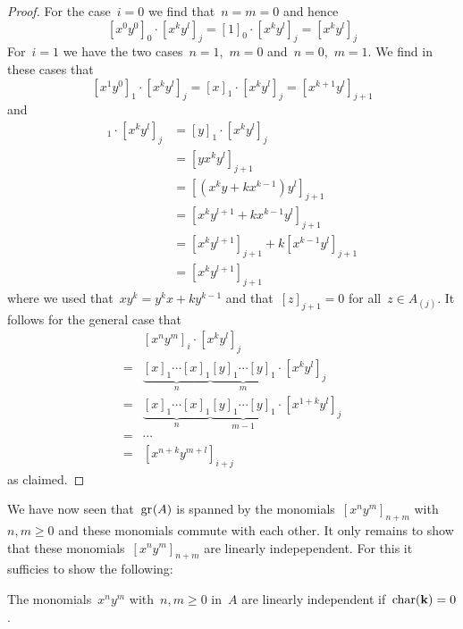 \begin{example}
  \begin{proof}
    For the case~$i = 0$ we find that~$n = m = 0$ and hence
    \[
      [x^0 y^0]_0 \cdot [x^k y^l]_j
      =
      [1]_0 \cdot [x^k y^l]_j
      =
      [x^k y^l]_j
    \]
    For~$i = 1$ we have the two cases~$n = 1$,~$m = 0$ and~$n = 0$,~$m = 1$.
    We find in these cases that
    \[
      [x^1 y^0]_1 \cdot [x^k y^l]_j
      =
      [x]_1 \cdot [x^k y^l]_j
      =
      [x^{k+1} y^l]_{j+1}
    \]
    and
    \begin{align*}
      [x^0 y^1]_1 \cdot [x^k y^l]_j
      &=
      [y]_1 \cdot [x^k y^l]_j
      \\
      &=
      [y x^k y^l]_{j+1}
      \\
      &=
      [(x^k y + k x^{k-1}) y^l]_{j+1}
      \\
      &=
      [x^k y^{l+1} + k x^{k-1} y^l]_{j+1}
      \\
      &=
      [x^k y^{l+1}]_{j+1} + k [x^{k-1} y^l]_{j+1}
      \\
      &=
      [x^k y^{l+1}]_{j+1}
    \end{align*}
    where we used that~$x y^k = y^k x + k y^{k-1}$ and that~$[z]_{j+1} = 0$ for all~$z \in A_{(j)}$.
    It follows for the general case that
    \begin{align*}
      {}&
      [x^n y^m]_i \cdot [x^k y^l]_j
      \\
      ={}&
      \underbrace{ [x]_1 \dotsm [x]_1 }_{n}
      \underbrace{ [y]_1 \dotsm [y]_1 }_{m}
      \cdot
      [x^k y^l]_j
      \\
      ={}&
      \underbrace{ [x]_1 \dotsm [x]_1 }_{n}
      \underbrace{ [y]_1 \dotsm [y]_1 }_{m-1}
      \cdot
      [x^{1+k}  y^l]_j
      \\
      ={}&
      \dotsb
      \\
      ={}&
      [x^{n+k} y^{m+l}]_{i+j}
    \end{align*}
    as claimed.
  \end{proof}

  We have now seen that~$\gr(A)$ is spanned by the monomials~$[x^n y^m]_{n+m}$ with~$n, m \geq 0$ and these monomials commute with each other.
  It only remains to show that these monomials~$[x^n y^m]_{n+m}$ are linearly indepependent.
  For this it sufficies to show the following:
  
  \begin{claim}
    \label{linear independence of monomials}
    The monomials~$x^n y^m$ with~$n, m \geq 0$ in~$A$ are linearly independent if~$\operatorname{char}(\mathbf{k}) = 0$.
  \end{claim}
  

\end{example}
